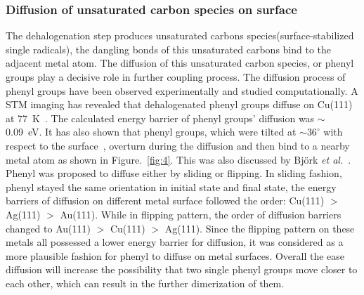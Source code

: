 \documentclass[%
 reprint,
 amsmath,amssymb,
 aps,
prb,
]{revtex4-2}
\begin{document}
\subsubsection{Diffusion of unsaturated carbon species on surface}

The dehalogenation step produces unsaturated carbons species(surface-stabilized single radicals), the dangling bonds of this unsaturated carbons bind to the adjacent metal atom. The diffusion of this  unsaturated carbon species, or phenyl groups play a decisive role in further coupling process. 
%
The diffusion process of phenyl groups have been observed experimentally and studied computationally. A STM imaging has revealed that dehalogenated phenyl groups diffuse on Cu(111) at 77~K~\cite{langm01}. The calculated energy barrier of phenyl groups' diffusion was $\sim$0.09~eV. It has also shown that phenyl groups, which were tilted at $\sim 36^\circ$ with respect to the surface~\cite{pccp2010}, overturn during the diffusion and then bind to a nearby metal atom as shown in Figure.~\ref{fig:4}. This was also discussed by Björk \textit{et al.}~\cite{jacs2013}. Phenyl was proposed to diffuse either by sliding or flipping. In sliding fashion, phenyl stayed the same orientation in initial state and final state, the energy barriers of diffusion on different metal surface followed the order: Cu(111) $>$ Ag(111) $>$ Au(111). While in flipping pattern, the order of diffusion barriers changed to Au(111) $>$ Cu(111) $>$ Ag(111). Since the flipping pattern on these metals all possessed a lower energy barrier for diffusion, it was considered as a more plausible fashion for phenyl to diffuse on metal surfaces. Overall the ease diffusion will increase the possibility that two single phenyl groups move closer to each other, which can result in the further dimerization of them.
\end{document}
